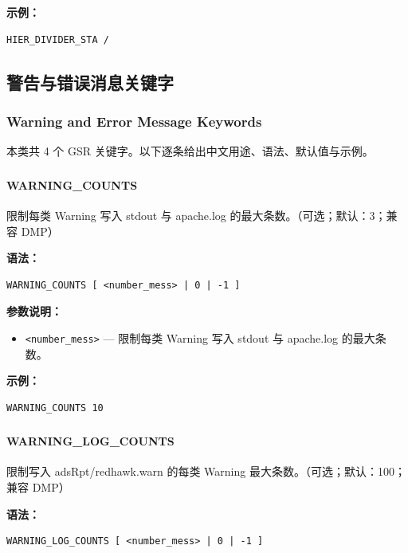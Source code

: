 \textbf{示例：}
\begin{lstlisting}
HIER_DIVIDER_STA /
\end{lstlisting}

\subsection{警告与错误消息关键字}
\subsubsection*{Warning and Error Message Keywords}

本类共 4 个 GSR 关键字。以下逐条给出中文用途、语法、默认值与示例。

\subsubsection{}
\paragraph*{WARNING_COUNTS}

限制每类 Warning 写入 stdout 与 apache.log 的最大条数。（可选；默认：3；兼容 DMP）

\textbf{语法：}
\begin{lstlisting}
WARNING_COUNTS [ <number_mess> | 0 | -1 ]
\end{lstlisting}

\textbf{参数说明：}
\begin{itemize}
\item \texttt{<number\_mess>} — 限制每类 Warning 写入 stdout 与 apache.log 的最大条数。
\end{itemize}

\textbf{示例：}
\begin{lstlisting}
WARNING_COUNTS 10
\end{lstlisting}

\subsubsection{}
\paragraph*{WARNING_LOG_COUNTS}

限制写入 adsRpt/redhawk.warn 的每类 Warning 最大条数。（可选；默认：100；兼容 DMP）

\textbf{语法：}
\begin{lstlisting}
WARNING_LOG_COUNTS [ <number_mess> | 0 | -1 ]
\end{lstlisting}

